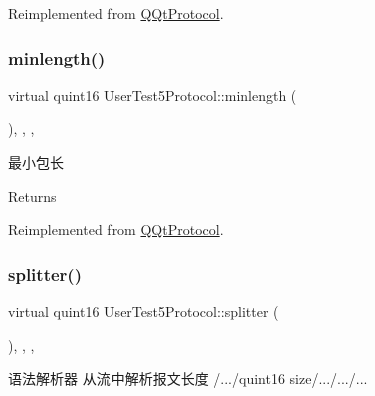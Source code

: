Reimplemented from \mbox{\hyperlink{class_q_qt_protocol_af41bc3116abbbcfc9af45e151a253ff7}{Q\+Qt\+Protocol}}.

\mbox{\label{class_user_test5_protocol_aba9c0f712e5f84bbd893ba3c67766850}} 
\subsubsection{\texorpdfstring{minlength()}{minlength()}}
{\footnotesize\ttfamily virtual quint16 User\+Test5\+Protocol\+::minlength (\begin{DoxyParamCaption}{ }\end{DoxyParamCaption})\hspace{0.3cm}{\ttfamily [inline]}, {\ttfamily [override]}, {\ttfamily [protected]}, {\ttfamily [virtual]}}



最小包长 

\begin{DoxyReturn}{Returns}

\end{DoxyReturn}


Reimplemented from \mbox{\hyperlink{class_q_qt_protocol_a2b00f53d3dd0eed817eeecff422891f3}{Q\+Qt\+Protocol}}.

\mbox{\label{class_user_test5_protocol_a142f40a8a2c8f98457046df8c8809379}} 
\subsubsection{\texorpdfstring{splitter()}{splitter()}}
{\footnotesize\ttfamily virtual quint16 User\+Test5\+Protocol\+::splitter (\begin{DoxyParamCaption}\item[{const Q\+Byte\+Array \&}]{ }\end{DoxyParamCaption})\hspace{0.3cm}{\ttfamily [inline]}, {\ttfamily [override]}, {\ttfamily [protected]}, {\ttfamily [virtual]}}



语法解析器 从流中解析报文长度 /.../quint16 size/.../.../... 


